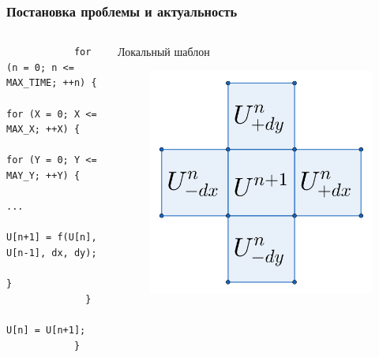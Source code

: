 \documentclass[presentation,18pt]{beamer}
\begin{document}
\begin{frame}[fragile,t]
	\label{introductory}
	\frametitle{Постановка проблемы и актуальность}


	\begin{columns}

		\begin{block}{}
			\begin{verbatim}
			for (n = 0; n <= MAX_TIME; ++n) {
			  for (X = 0; X <= MAX_X; ++X) {
			    for (Y = 0; Y <= MAY_Y; ++Y) {
			      ...
			      U[n+1] = f(U[n], U[n-1], dx, dy);
			    }
			  }
			  U[n] = U[n+1];
			}
			\end{verbatim}
		\end{block}

		\begin{block}{Локальный шаблон}
			\begin{figure}
				\includegraphics[width=\textwidth]{img/CropStencil.png}
			\end{figure}
		\end{block}


\end{columns}
\end{frame}
\end{document}
